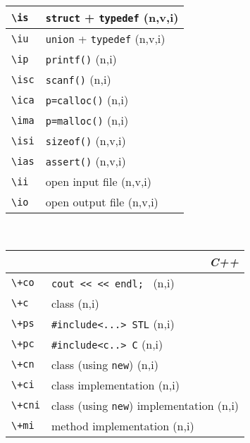 \documentclass[oneside,11pt,landscape,DIV16]{scrartcl}
\begin{document}
\begin{multicols}{3}
\begin{center}
\begin{tabular}[]{|p{11mm}|p{60mm}|}
\hline \verb'\is'  & \verb'struct' + \verb'typedef'   \hfill (n,v,i)\\
\hline \verb'\iu'  & \verb'union'  + \verb'typedef'   \hfill (n,v,i)\\
\hline \verb'\ip'  & \verb'printf()'                  \hfill (n,i)\\
\hline \verb'\isc' & \verb'scanf()'                   \hfill (n,i)\\
\hline \verb'\ica' & \verb'p=calloc()'                \hfill (n,i)\\
\hline \verb'\ima' & \verb'p=malloc()'                \hfill (n,i)\\
\hline \verb'\isi' & \verb'sizeof()'                  \hfill (n,v,i)\\
\hline \verb'\ias' & \verb'assert()'                  \hfill (n,v,i)\\
\hline \verb'\ii'  & open input file                  \hfill (n,v,i)\\
\hline \verb'\io'  & open output file                 \hfill (n,v,i)\\
\hline
\end{tabular}\\
%
%
\begin{tabular}[]{|p{12mm}|p{62mm}|}
\hline 
\multicolumn{2}{|r|}{\textsl{C\textbf{+}+}} \\
\hline \verb'\+co'  & \verb'cout << << endl; '                \hfill (n,i)\\
\hline \verb'\+c'   & class                                   \hfill (n,i)\\
\hline \verb'\+ps'  & \verb$#include<...> STL$                \hfill (n,i)\\
\hline \verb'\+pc'  & \verb$#include<c..> C$                  \hfill (n,i)\\
\hline \verb'\+cn'  & class (using \verb'new')                \hfill (n,i)\\
\hline \verb'\+ci'  & class  implementation                   \hfill (n,i)\\
\hline \verb'\+cni' & class (using \verb'new') implementation \hfill (n,i)\\
\hline \verb'\+mi'  & method implementation                   \hfill (n,i)\\

\end{tabular}
\end{center}
\end{multicols}
\end{document}
